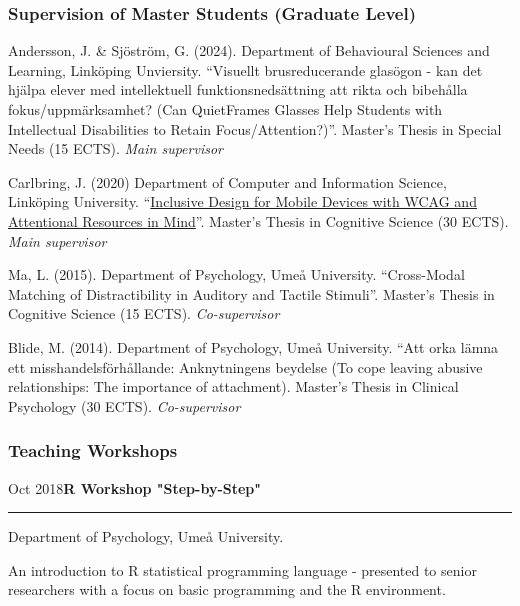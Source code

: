 \documentclass[]{article}
\begin{document}
\subsubsection{Supervision of Master Students (Graduate
Level)}\label{supervision-of-master-students-graduate-level}

Andersson, J. \& Sjöström, G. (2024). Department of Behavioural Sciences
and Learning, Linköping Unviersity. ``Visuellt brusreducerande glasögon
- kan det hjälpa elever med intellektuell funktionsnedsättning att rikta
och bibehålla fokus/uppmärksamhet? (Can QuietFrames Glasses Help
Students with Intellectual Disabilities to Retain Focus/Attention?)''.
Master's Thesis in Special Needs (15 ECTS). \emph{Main supervisor}

Carlbring, J. (2020) Department of Computer and Information Science,
Linköping University.
``\href{http://liu.diva-portal.org/smash/record.jsf?dswid=-6296&faces-redirect=true&language=en&searchType=SIMPLE&query=Marsja&af=\%5B\%5D&aq=\%5B\%5B\%5D\%5D&aq2=\%5B\%5B\%5D\%5D&aqe=\%5B\%5D&pid=diva2\%3A1441358&noOfRows=50&sortOrder=author_sort_asc&sortOrder2=title_sort_asc&onlyFullText=false&sf=undergraduate}{Inclusive
Design for Mobile Devices with WCAG and Attentional Resources in
Mind}''. Master's Thesis in Cognitive Science (30 ECTS). \emph{Main
supervisor}

Ma, L. (2015). Department of Psychology, Umeå University. ``Cross-Modal
Matching of Distractibility in Auditory and Tactile Stimuli''. Master's
Thesis in Cognitive Science (15 ECTS). \emph{Co-supervisor}

Blide, M. (2014). Department of Psychology, Umeå University. ``Att orka
lämna ett misshandelsförhållande: Anknytningens beydelse (To cope
leaving abusive relationships: The importance of attachment). Master's
Thesis in Clinical Psychology (30 ECTS). \emph{Co-supervisor}

\subsubsection{Teaching Workshops}\label{teaching-workshops}

Oct 2018\hspace{0.75cm}\textbf{R Workshop "Step-by-Step"}\vspace{1mm}

\hrule
\begin{changemargin}{2.15cm}{2.4cm}


Department of Psychology, Umeå University.

An introduction to R statistical programming language - presented to senior researchers with a focus on basic programming and the R environment.

\end{changemargin}
\end{document}
